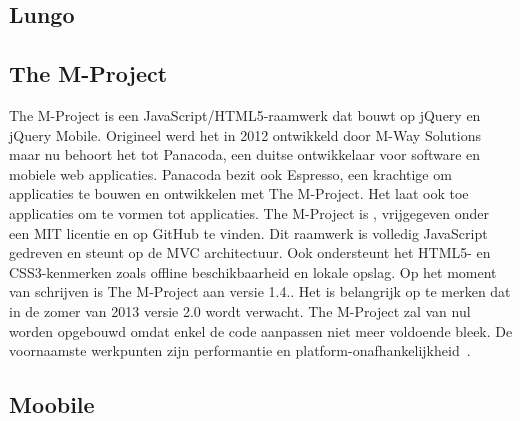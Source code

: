 \subsection{Lungo} %

\subsection{The M-Project} %


The M-Project is een JavaScript/HTML5-raamwerk dat bouwt op jQuery en jQuery Mobile.
Origineel werd het in 2012 ontwikkeld door M-Way Solutions maar nu behoort het tot Panacoda,  een duitse ontwikkelaar voor software  en mobiele web applicaties.
Panacoda bezit ook Espresso,  een krachtige  om applicaties te bouwen en ontwikkelen met The M-Project.
Het laat ook toe applicaties om te vormen tot  applicaties. 
The M-Project is ,  vrijgegeven onder een MIT licentie en op GitHub te vinden.
Dit raamwerk is volledig JavaScript gedreven en steunt op de MVC architectuur.
Ook ondersteunt het HTML5- en CSS3-kenmerken zoals offline  beschikbaarheid en lokale opslag.
Op het moment van schrijven is The M-Project aan versie 1.4..  
Het is belangrijk op te merken dat in de zomer van 2013 versie 2.0 wordt verwacht.  
The M-Project zal van nul worden opgebouwd omdat enkel de code aanpassen niet meer voldoende bleek.  
De voornaamste werkpunten zijn performantie en platform-onafhankelijkheid~\cite{Panacoda,Laubach2013}.

\subsection{Moobile} %

